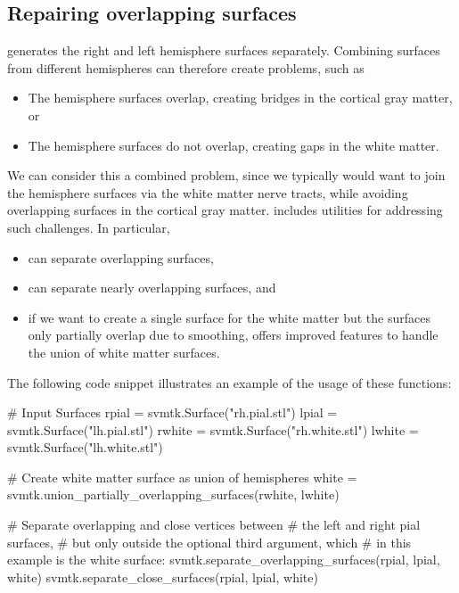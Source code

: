 \subsection{Repairing overlapping surfaces}
\freesurfer{} generates the right and left hemisphere surfaces
separately. Combining surfaces from different hemispheres
can therefore create problems, such as
\begin{itemize}
\item The hemisphere surfaces overlap, creating bridges in the cortical gray matter, or
\item The hemisphere surfaces do not overlap, creating gaps in the white matter. 
\end{itemize} 
We can consider this a combined problem, since we typically would want
to join the hemisphere surfaces via the white matter nerve tracts, while
avoiding overlapping surfaces in the cortical gray matter. \svmtk{}
includes utilities for addressing such challenges. In particular,
\begin{itemize}
\item
   can separate
  overlapping surfaces,
\item
   can separate nearly
  overlapping surfaces, and
\item 
  if we want to create a single surface for the white matter but the
  surfaces only partially overlap due to smoothing,
   offers
  improved features to handle the union of white matter surfaces.
\end{itemize}
The following code snippet illustrates an example of the usage of these functions:
\begin{python}
# Input Surfaces
rpial = svmtk.Surface("rh.pial.stl")
lpial = svmtk.Surface("lh.pial.stl")
rwhite = svmtk.Surface("rh.white.stl")
lwhite = svmtk.Surface("lh.white.stl")

# Create white matter surface as union of hemispheres
white = svmtk.union_partially_overlapping_surfaces(rwhite,
                                                   lwhite)

# Separate overlapping and close vertices between
# the left and right pial surfaces,
# but only outside the optional third argument, which
# in this example is the white surface:
svmtk.separate_overlapping_surfaces(rpial, lpial, white)
svmtk.separate_close_surfaces(rpial, lpial, white) 
\end{python} 

